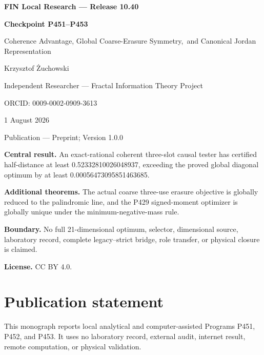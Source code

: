 \documentclass[11pt,a4paper,openany]{report}
\begin{document}
\hypersetup{pageanchor=false}
\begin{titlepage}
\centering
\vspace*{8mm}
{\Large\bfseries FIN Local Research --- Release 10.40\par}
\vspace{10mm}
{\Huge\bfseries Checkpoint P451--P453\par}
\vspace{6mm}
{\Large Coherence Advantage, Global Coarse-Erasure Symmetry,\
and Canonical Jordan Representation\par}
\vspace{14mm}
{\Large Krzysztof \.Zuchowski\par}
\vspace{2mm}
{\normalsize Independent Researcher --- Fractal Information Theory Project\par}
\vspace{2mm}
{\normalsize ORCID: 0009-0002-0909-3613\par}
\vspace{8mm}
{\large 1 August 2026\par}
{\normalsize Publication --- Preprint; Version 1.0.0\par}
\vfill
\begin{minipage}{0.92\textwidth}
\small
\textbf{Central result.}
An exact-rational coherent three-slot causal tester has certified half-distance
at least 0.52332810026048937, exceeding the proved global diagonal optimum by
at least 0.00056473095851463685.

\medskip
\textbf{Additional theorems.}
The actual coarse three-use erasure objective is globally reduced to the
palindromic line, and the P429 signed-moment optimizer is globally unique
under the minimum-negative-mass rule.

\medskip
\textbf{Boundary.}
No full 21-dimensional optimum, selector, dimensional source, laboratory
record, complete legacy--strict bridge, role transfer, or physical closure
is claimed.

\medskip
\textbf{License.} CC BY 4.0.
\end{minipage}
\vfill
\end{titlepage}
\hypersetup{pageanchor=true}
\chapter*{Publication statement}
This monograph reports local analytical and computer-assisted Programs P451,
P452, and P453. It uses no laboratory record, external audit, internet result,
remote computation, or physical validation.
\tableofcontents
\clearpage
{}
\end{document}
